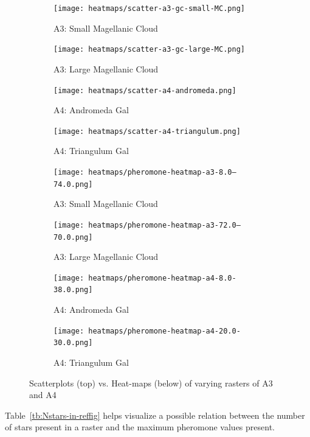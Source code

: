 \begin{figure}[H]
    \centering
    \begin{subfigure}[b]{0.24\textwidth}
        \texttt{[image: heatmaps/scatter-a3-gc-small-MC.png]}
        \caption{\label{fig:scatter-small-magellanic-cloud}A3: Small Magellanic Cloud}
    \end{subfigure}
    \begin{subfigure}[b]{0.24\textwidth}
        \texttt{[image: heatmaps/scatter-a3-gc-large-MC.png]}
        \caption{\label{fig:scatter-large-magellanic-cloud}A3: Large Magellanic Cloud}
    \end{subfigure}
    \begin{subfigure}[b]{0.24\textwidth}
        \texttt{[image: heatmaps/scatter-a4-andromeda.png]}
        \caption{\label{fig:scatter-andromeda}A4: Andromeda Gal}
    \end{subfigure}
    \begin{subfigure}[b]{0.24\textwidth}
        \texttt{[image: heatmaps/scatter-a4-triangulum.png]}
        \caption{\label{fig:scatter-triangulum}A4: Triangulum Gal}
    \end{subfigure}
    \begin{subfigure}[b]{0.24\textwidth}
        \texttt{[image: heatmaps/pheromone-heatmap-a3-8.0--74.0.png]}
        \caption{\label{fig:heat-small-magellanic-cloud}A3: Small Magellanic Cloud}
    \end{subfigure}
    \begin{subfigure}[b]{0.24\textwidth}
        \texttt{[image: heatmaps/pheromone-heatmap-a3-72.0--70.0.png]}
        \caption{\label{fig:heat-large-magellanic-cloud}A3: Large Magellanic Cloud}
    \end{subfigure}
    \begin{subfigure}[b]{0.24\textwidth}
        \texttt{[image: heatmaps/pheromone-heatmap-a4-8.0-38.0.png]}
        \caption{\label{fig:heat-andromeda}A4: Andromeda Gal}
    \end{subfigure}
    \begin{subfigure}[b]{0.24\textwidth}
        \texttt{[image: heatmaps/pheromone-heatmap-a4-20.0-30.0.png]}
        \caption{\label{fig:heat-triangulum}A4: Triangulum Gal}
    \end{subfigure}

    \caption{\label{fig:scatterplot-heatmaps-A34} Scatterplots (top) vs. Heat-maps (below) of varying rasters of A3 and A4}
\end{figure}


Table~\ref{tb:Nstars-in-reffig} helps visualize a possible relation between the number of stars present in a raster and the maximum pheromone values present.

